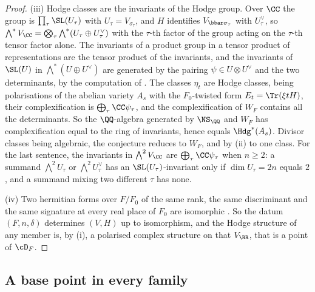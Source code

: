 \begin{proof}
(iii) Hodge classes are the invariants of the Hodge group. Over $\CC$ the
group is $\prod_{\tau}\SL(U_{\tau})$ with $U_{\tau}=V_{\sigma_{\tau}}$, and
$H$ identifies $V_{\bbar\sigma_{\tau}}$ with $U_{\tau}^{\vee}$, so
$\bigwedge^{*}V_{\CC}=\bigotimes_{\tau}\bigwedge^{*}(U_{\tau}\oplus U_{\tau}^{\vee})$
with the $\tau$-th factor of the group acting on the $\tau$-th tensor factor
alone. The invariants of a product group in a tensor product of
representations are the tensor product of the invariants, and the invariants
of $\SL(U)$ in $\bigwedge^{*}(U\oplus U^{\vee})$ are generated by the pairing
$\psi\in U\otimes U^{\vee}$ and the two determinants, by the computation of
. The classes $\eta_{t}$ are Hodge classes, being
polarisations of the abelian variety $A_{s}$ with the $F_{0}$-twisted form
$E_{t}=\Tr(\xi tH)$, their complexification is $\bigoplus_{\tau}\CC\psi_{\tau}$,
and the complexification of $W_{F}$ contains all the determinants. So the
$\QQ$-algebra generated by $\NS_{\QQ}$ and $W_{F}$ has complexification equal
to the ring of invariants, hence equals $\Hdg^{*}(A_{s})$. Divisor classes
being algebraic, the conjecture reduces to $W_{F}$, and by (ii) to one class.
For the last sentence, the invariants in $\bigwedge^{2}V_{\CC}$ are
$\bigoplus_{\tau}\CC\psi_{\tau}$ when $n\ge2$: a summand
$\bigwedge^{2}U_{\tau}$ or $\bigwedge^{2}U_{\tau}^{\vee}$ has an
$\SL(U_{\tau})$-invariant only if $\dim U_{\tau}=2n$ equals $2$, and a summand
mixing two different $\tau$ has none.

(iv) Two hermitian forms over $F/F_{0}$ of the same rank, the same
discriminant and the same signature at every real place of $F_{0}$ are
isomorphic \cite[Ch.~10, \S6]{Sch85}. So the datum $(F,n,\delta)$ determines
$(V,H)$ up to isomorphism, and the Hodge structure of any member is, by (i), a
polarised complex structure on that $V_{\RR}$, that is a point of $\cD_{F}$.
\end{proof}

\subsection{A base point in every family}

